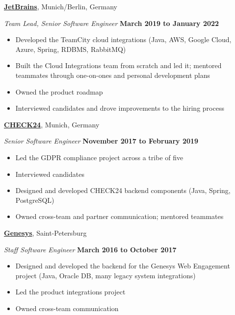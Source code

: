 \documentclass[10pt]{article}
\newcommand{\halfblankline}{\quad\vspace{-0.5\baselineskip}\pagebreak[3]}
\begin{document}
\vspace{0.1in}
\halfblankline
{}
\href{https://jetbrains.com}{\textbf{JetBrains}}, Munich/Berlin, Germany
\begin{outerlist}
    \item[] \textit{Team Lead, Senior Software Engineer}
      \hfill \textbf{March 2019 to January 2022}
      \begin{itemize}
        \item Developed the TeamCity cloud integrations (Java, AWS, Google Cloud, Azure, Spring, RDBMS, RabbitMQ)
        \item Built the Cloud Integrations team from scratch and led it; mentored teammates through one-on-ones and personal development plans
        \item Owned the product roadmap
        \item Interviewed candidates and drove improvements to the hiring process
        \end{itemize}
      \end{outerlist}
\vspace{0.1in}
\halfblankline
{}
\href{https://www.check24.de}{\textbf{CHECK24}}, Munich, Germany
\begin{outerlist}
    \item[] \textit{Senior Software Engineer}
      \hfill \textbf{November 2017 to February 2019}
      \begin{itemize}
        \item Led the GDPR compliance project across a tribe of five
        \item Interviewed candidates
        \item Designed and developed CHECK24 backend components (Java, Spring, Postgre\-SQL)
        \item Owned cross-team and partner communication; mentored teammates
        \end{itemize}
      \end{outerlist}
\vspace{0.1in}
\halfblankline
{}
\href{http://www.genesys.com}{\textbf{Genesys}}, Saint-Petersburg
\begin{outerlist}
    \item[] \textit{Staff Software Engineer}
      \hfill \textbf{March 2016 to October 2017}
      \begin{itemize}
        \item Designed and developed the backend for the Genesys Web Engagement project (Java, Oracle DB, many legacy system integrations)
        \item Led the product integrations project
        \item Owned cross-team communication
        \end{itemize}
      \end{outerlist}
\end{document}

